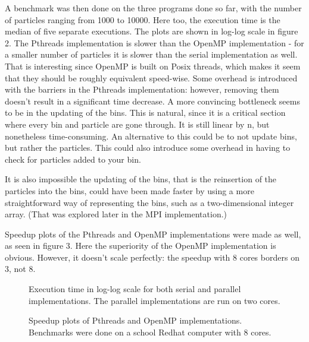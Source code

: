 \documentclass{article}
\begin{document}
A benchmark was then done on the three programs done so far, with the number of particles ranging from 1000 to 10000. Here too, the execution time is the median of five separate executions. The plots are shown in log-log scale in figure 2. The Pthreads implementation is slower than the OpenMP implementation - for a smaller number of particles it is slower than the serial implementation as well. That is  interesting since OpenMP is built on Posix threads, which makes it seem that they should be roughly equivalent speed-wise. Some overhead is introduced with the barriers in the Pthreads implementation: however, removing them doesn't result in a significant time decrease. A more convincing bottleneck seems to be in the updating of the bins. This is natural, since it is a critical section where every bin and particle are gone through. It is still linear by n, but nonetheless time-consuming. An alternative to this could be to not update bins, but rather the particles. This could also introduce some overhead in having to check for particles added to your bin. 

It is also impossible the updating of the bins, that is the reinsertion of the particles into the bins, could have been made faster by using a more straightforward way of representing the bins, such as a two-dimensional integer array. (That was explored later in the MPI implementation.)

Speedup plots of the Pthreads and OpenMP implementations were made as well, as seen in figure 3. Here the superiority of the OpenMP implementation is obvious. However, it doesn't scale perfectly: the speedup with 8 cores borders on 3, not 8.

\begin{figure}[h]
    \begin{center}
        
        \caption{Execution time in log-log scale for both serial and parallel implementations. The parallel implementations are run on two cores.}
        \label{fig:linear}
    \end{center}
\end{figure}


\begin{figure}[h]
    \begin{center}
        
        \caption{Speedup plots of Pthreads and OpenMP implementations. Benchmarks were done on a school Redhat computer with 8 cores.} 
        \label{fig:linear}
    \end{center}
\end{figure}
\end{document}
